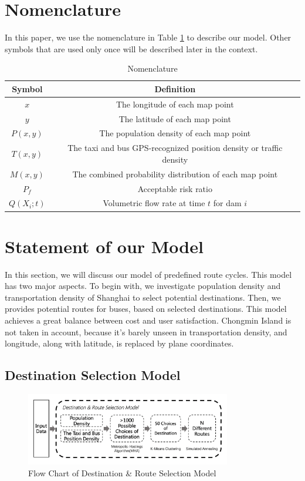 \documentclass{mcmthesis}
\begin{document}
\section{Nomenclature}\label{sec:Nome}
In this paper, we use the nomenclature in Table \ref{tab:Nomen} to describe our model. Other symbols that are used only once will be described later in the context.
\begin{table}
    \centering
    \caption{Nomenclature}
    \label{tab:Nomen}
    \begin{tabular}{c c}
\hline
    	Symbol & Definition\\
\hline
	$x$ & The longitude of each map point\\
	$y$ & The latitude of each map point\\
	$P(x,y)$ & The population density of each map point\\
	$T(x,y)$ & The taxi and bus GPS-recognized position density or traffic density\\
	$M(x,y)$ & The combined probability distribution of each map point\\
	$P_f$ & Acceptable risk ratio\\
	$Q(X_i;t)$ & Volumetric flow rate at time $t$ for dam $i$\\
\hline
    \end{tabular}
\end{table}

\section{Statement of our Model}\label{sec:stat}

In this section, we will discuss our model of predefined route cycles. This model has two major aspects. To begin with, we investigate population density and transportation density of Shanghai to select potential destinations. Then, we provides potential routes for buses, based on selected destinations. This model achieves a great balance between cost and user satisfaction. Chongmin Island is not taken in account, because it's barely unseen in transportation density, and longitude, along with latitude, is replaced by plane coordinates.

\subsection{Destination Selection Model}

\begin{figure}[h]
    \centering
    \includegraphics[width=0.8\textwidth]{figures/flowchart.png}
    \caption{Flow Chart of Destination \& Route Selection Model}
    \label{fig:flowchart}
\end{figure}
\end{document}
